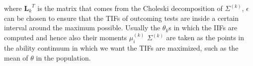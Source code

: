where ${\boldsymbol{L}_k}^T$ is the matrix that comes from the Choleski decomposition of $\Sigma^{(k)}$, $\epsilon$ can be chosen to ensure that the TIFs of outcoming tests are inside a certain interval around the maximum possible. Usually the $\theta_k$s in which the IIFs are computed and hence also their moments $\mu^{(k)}_i$  $\Sigma^{(k)}$ are taken as the points in the ability continuum in which we want the TIFs are maximized, such as the mean of $\theta$ in the population.



